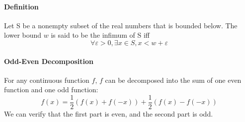 \documentclass[11pt]{article}
\begin{document}
\paragraph{Definition} Let S be a nonempty subset of the real numbers that is bounded below. The lower bound $w$ is said to be the infimum of S iff $$\forall \varepsilon >0, \exists x \in S, x < w + \varepsilon$$
\paragraph{Odd-Even Decomposition}
For any continuous function $f$, $f$ can be decomposed into the sum of one even function and one odd function:
$$f(x) = \frac{1}{2}(f(x) + f(-x)) + \frac{1}{2}(f(x) - f(-x))$$
We can verify that the first part is even, and the second part is odd.
\end{document}
